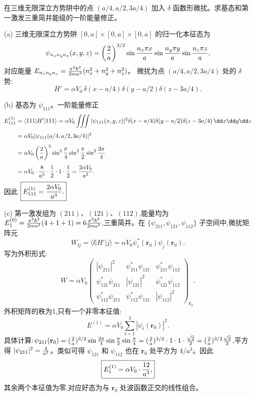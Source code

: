 \begin{question}
在三维无限深立方势阱中的点 $(a/4,a/2,3a/4)$ 加入 $\delta$ 函数形微扰。求基态和第一激发三重简并能级的一阶能量修正。
\end{question}
\begin{solution}
(a) 三维无限深立方势阱 $[0,a]\times[0,a]\times[0,a]$ 的归一化本征态为
\[
\psi_{n_xn_yn_z}(x,y,z)=\left({2\over a}\right)^{3/2}
\sin{n_x\pi x\over a}\sin{n_y\pi y\over a}\sin{n_z\pi z\over a},
\]
对应能量 $E_{n_xn_yn_z}={\pi^2\hbar^2\over2ma^2}(n_x^2+n_y^2+n_z^2)$。
微扰为点 $(a/4,a/2,3a/4)$ 处的 $\delta$ 势:
\[
H'=\alpha V_0\,\delta(x-a/4)\delta(y-a/2)\delta(z-3a/4).
\]

(b) 基态为 $\psi_{111}$。一阶能量修正
\[
\begin{aligned}
E_{111}^{(1)}&=\langle111|H'|111\rangle
=\alpha V_0\iiint|\psi_{111}(x,y,z)|^2
\delta(x-a/4)\delta(y-a/2)\delta(z-3a/4)\,\dd x\dd y\dd z \\[4pt]
&=\alpha V_0|\psi_{111}(a/4,a/2,3a/4)|^2 \\[4pt]
&=\alpha V_0\left({2\over a}\right)^{3}
\sin^2{\pi\over4}\sin^2{\pi\over2}\sin^2{3\pi\over4} \\[4pt]
&=\alpha V_0\cdot{8\over a^3}\cdot{1\over2}\cdot1\cdot{1\over2}
={2\alpha V_0\over a^3}.
\end{aligned}
\]
因此 $\boxed{E_{111}^{(1)}={2\alpha V_0\over a^3}.}$

(c) 第一激发组为 $(211)$、$(121)$、$(112)$,能量均为 $E_1^{(0)}={\pi^2\hbar^2\over2ma^2}(4+1+1)=6{\pi^2\hbar^2\over2ma^2}$,三重简并。在 $\{\psi_{211},\psi_{121},\psi_{112}\}$ 子空间中,微扰矩阵元
\[
W_{\ii j}=\langle \ii|H'|j\rangle
=\alpha V_0\psi_i^*(\mathbf r_0)\psi_j(\mathbf r_0).
\]
写为外积形式:
\[
W=\alpha V_0\begin{pmatrix}
|\psi_{211}|^2 & \psi_{211}^*\psi_{121} & \psi_{211}^*\psi_{112}\\[2pt]
\psi_{121}^*\psi_{211} & |\psi_{121}|^2 & \psi_{121}^*\psi_{112}\\[2pt]
\psi_{112}^*\psi_{211} & \psi_{112}^*\psi_{121} & |\psi_{112}|^2
\end{pmatrix}_{\mathbf r_0}.
\]
外积矩阵的秩为1,只有一个非零本征值:
\[
E^{(1)}=\alpha V_0\sum_{\ii=1}^3|\psi_i(\mathbf r_0)|^2.
\]
具体计算:$\psi_{211}(\mathbf r_0)=({2\over a})^{3/2}\sin{2\pi\over4}\sin{\pi\over2}\sin{\pi\over4}
=({2\over a})^{3/2}\cdot1\cdot1\cdot{\sqrt2\over2}=({2\over a})^{3/2}{\sqrt2\over2}$,平方得 $|\psi_{211}|^2={4\over a^3}$。类似可得 $\psi_{121}$ 和 $\psi_{112}$ 也在 $\mathbf r_0$ 处平方为 $4/a^3$。因此
\[
\boxed{E_1^{(1)}=\alpha V_0\cdot{12\over a^3},}
\]
其余两个本征值为零,对应好态为与 $\mathbf r_0$ 处波函数正交的线性组合。
\end{solution}

